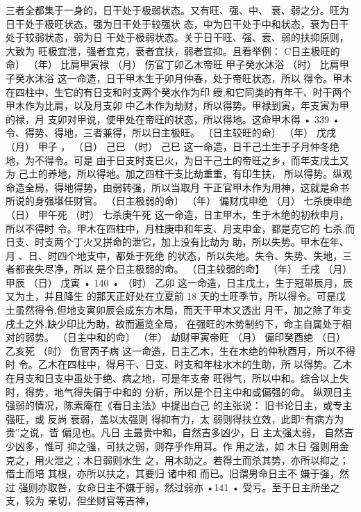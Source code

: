 三者全都集于一身的，日干处于极弱状态。又有旺、强、中、
衰、弱之分。旺为日干处于极旺状态，强为日干处于较强状
态，中为日干处于中和状态，衰为日干处于较弱状态，弱为日
干处于极弱状态。关于日干旺、强、衰、弱的扶抑原则，大致为
旺极宜泄，强者宜克，衰者宜扶，弱者宜抑。且看举例：
C日主极旺的命〕
（年） 比肩甲寅禄
（月） 伤官丁卯乙木帝旺
甲子癸水沐浴
（时） 比肩甲子癸水沐浴
这一命造，日干甲木生于卯月仲春，处于帝旺状态，所以
得令。甲木在四柱中，生它的有日支和时支两个癸水作为印
绶,和它同类的有年干、时干两个甲木作为比肩，以及月支卯
中乙木作为劫财，所以得势。甲禄到寅，年支寅为甲的禄，月
支卯对甲说，使甲处在帝旺的状态，所以得地。这命甲木得
• 339 •
令、得势、得地，三者兼得，所以日主极旺。
〔日主较旺的命〕
（年） 戊戌
（月） 甲子 ，
（日） 己巳
（时） 己巳
这一命造，日干己土生于子月仲冬绝地，为不得令。可是
由于日支时支巳火，为日干己土的帝旺之乡，而年支戌土又为
己土的养地，所以得地。加之四柱干支比劫重重，有印生扶，
所以得势。纵观命造全局，得地得势，由弱转强，所以当取月
干正官甲木作为用神，这就是命书所说的身强堪任财官。
（日主极弱的命〕
（年） 偏财戊申绝
（月） 七杀庚申绝
（日） 甲午死
（时） 七杀庚午死
这一命造，日主甲木，生于木绝的初秋申月，所以不得时
令。甲木在四柱中，月柱庚申和年支、月支申金，都是克它的
七杀,而日支、时支两个丁火又拼命的泄它，加上没有比劫为
助，所以失势。甲木在年、月 、日、时四个地支中，都处于死绝
的状态，所以失地。失令、失势、失地，三者都丧失尽净，所以
是个日主极弱的命。
（日主较弱的命】
（年） 壬戌
（月） 甲辰
（日） 戊寅
• 140 •
（时） 乙卯
这一命造，日主戊土，生于冠带辰月，辰又为土，并且降生
的那天正好处在立夏前 18 天的土旺季节，所以得令。可是戊
土虽然得令,但地支寅卯辰会成东方木局，而天干甲木又透出
月干，加之除了年支戌土之外,缺少印比为助，故而遍览全局，
在强旺的木势制约下，命主自属处于相对的弱势。
（日主中和的命〕
（年） 劫财甲寅帝旺
（月） 偏印癸酉绝
（日） 乙亥死
（时） 伤官丙子病
这一命造，日主乙木，生在木绝的仲秋酉月，所以不得时
令。乙木在四柱中，得月干、日支、时支和年柱水木的生助，所
以得势。乙木在月支和日支中虽处于绝、病之地，可是年支帝
旺得气，所以中和。综合以上失时，得势，地气得失偏于中和的
分析，所以是个日主中和或偏强的命。
纵观日主强弱的情况，陈素庵在《看日主法》中提出白己
的主张说：
旧书论日主，或专主强旺，或 反尚 衰弱，盖以太强则
得抑有力，太 弱则得扶立效，此即“有病方为贵”之说，皆
偏见也。凡日 主最贵中和，自然吉多凶少，日 主太强太弱，
自然吉少凶多，惟可 抑之强，可扶之弱，则存乎作用耳。作
用之法，如 木日 强则用金克之，用火泄之；木日弱则水生
之，用木助之。若得土而杀其势，亦所以抑之；借土而培
其根，亦所以扶之，其要归 诸中和 而已。旧谓男命日主不
嫌于强，然过 强则亦取咎，女命日主不嫌于弱，然过弱亦
•141 •
受亏。至于日主所坐之支，较为 亲切，但坐财官等吉神，
